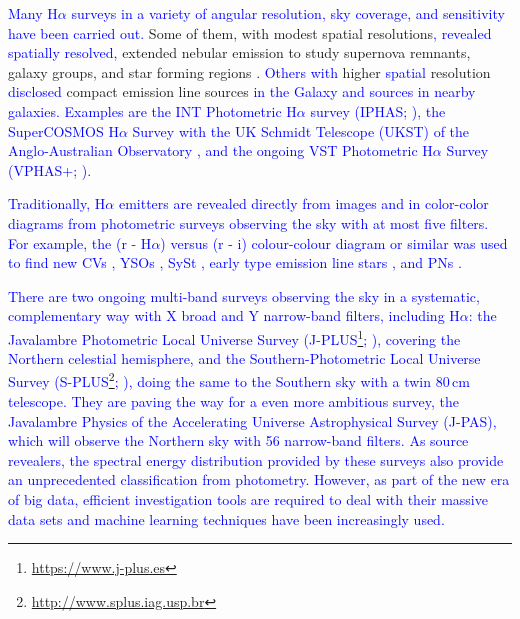 \documentclass[fleqn,usenatbib]{mnras}
\newcommand{\rlopes}[1]{\textcolor{blue}{#1}}
\begin{document}
\rlopes{Many H$\alpha$ surveys in a variety of angular resolution, sky coverage, and sensitivity have been carried out.}
Some of them, with modest spatial resolutions\rlopes{, revealed} 
\rlopes{spatially resolved,} 
extended nebular emission to study supernova remnants, galaxy
groups, and star forming regions \citep[e.g.][]{1976MmRAS..81...89D}. 
\rlopes{Others with} 
higher 
\rlopes{spatial} resolution 
\rlopes{disclosed} compact emission line sources
\rlopes{in the Galaxy and sources in nearby galaxies.}
\rlopes{Examples are the INT Photometric H$\alpha$ survey
(IPHAS; \citealt{Drew:2005, Barentsen:2014}), the  SuperCOSMOS H$\alpha$ Survey with the UK Schmidt Telescope (UKST) of the Anglo-Australian Observatory \citep{2005MNRAS.362..689P}, and the ongoing VST Photometric H$\alpha$ Survey (VPHAS+; \citealt{Drew:2014}).}

\rlopes{Traditionally, H$\alpha$ emitters are revealed directly from images and in color-color diagrams from photometric surveys observing the sky with at most five filters. For example, the (r - H$\alpha$) versus (r - i) colour-colour diagram or similar was used
to find new 
CVs \citep{Witham:2006,Witham:2007}, 
YSOs \citep{Vink:2008}, 
SySt \citep{Corradi:2008, Corradi:2010, Corradi:2011}, 
early type emission
line stars \citep{Drew:2008}, 
and PNs \citep{Viirone:2009, Sabin:2010}.} 

\rlopes{There are two ongoing multi-band surveys observing the sky in a systematic, complementary way with X broad and Y narrow-band filters, including H$\alpha$: the Javalambre Photometric Local Universe Survey
(J-PLUS\footnote{\url{https://www.j-plus.es}}; \citealp{Cenarro:2018}), covering the Northern celestial hemisphere, and the Southern-Photometric Local Universe Survey
(S-PLUS\footnote{\url{http://www.splus.iag.usp.br}}; \citealp{Mendes:2019}), doing the same to the Southern sky with a twin 80\,cm telescope. They are paving the way for a even more ambitious survey, the Javalambre Physics of the Accelerating Universe Astrophysical Survey (J-PAS), which will observe the Northern sky with 56 narrow-band filters. As source revealers, the spectral energy distribution provided by these surveys also provide an unprecedented classification from photometry. However, as part of the new era of big data, efficient investigation tools are required to deal with their massive data sets and machine learning techniques have been increasingly used.}
\end{document}
